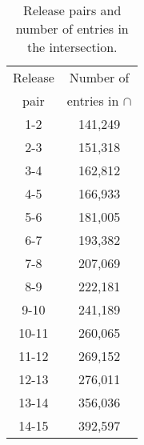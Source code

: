 \begin{table}[!h]
  \caption{Release pairs and number of entries in the intersection. }
  \label{tab_pairs}
  \scriptsize
  \begin{center}
    \begin{tabular}{cc}
	Release & Number of \\
	pair & entries in $\cap$\\
    \hline
	1-2 & 141,249 \\
	2-3 & 151,318 \\ 
	3-4 & 162,812 \\
	4-5 & 166,933 \\
	5-6 & 181,005 \\
	6-7 & 193,382 \\
	7-8 & 207,069 \\
	8-9 & 222,181 \\
	9-10 & 241,189 \\
	10-11 & 260,065 \\
	11-12 & 269,152 \\
	12-13 & 276,011 \\
	13-14 & 356,036 \\
	14-15 & 392,597 \\
    \end{tabular}
  \end{center}
\end{table}


